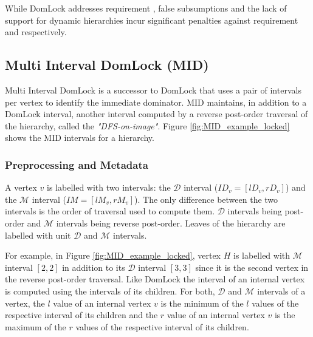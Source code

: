 
While DomLock addresses requirement \Rb, false subsumptions and the lack of support for dynamic hierarchies incur significant penalties against requirement \Rc and \Rd respectively.



\subsection{Multi Interval DomLock (MID)}
Multi Interval DomLock \cite{anjuMID} is a successor to DomLock that uses a pair of intervals per vertex to identify the immediate dominator. MID maintains, in addition to a DomLock interval, another interval computed by a reverse post-order traversal of the hierarchy, called the \emph{"DFS-on-image"}. Figure \ref{fig:MID_example_locked} shows the MID intervals for a hierarchy. 

\subsubsection{Preprocessing and Metadata}

A vertex $v$ is labelled with two intervals: the $\mathcal{D}$ interval ($\mathit{ID}_v = [\mathit{lD}_v, \mathit{rD}_v]$) and the $\mathcal{M}$ interval ($\mathit{IM} = [\mathit{lM}_v, \mathit{rM}_v]$). The only difference between the two intervals is the order of traversal used to compute them. $\mathcal{D}$ intervals being post-order and $\mathcal{M}$ intervals being reverse post-order. Leaves of the hierarchy are labelled with unit $\mathcal{D}$ and $\mathcal{M}$ intervals. 

For example, in Figure \ref{fig:MID_example_locked}, vertex $H$ is labelled with $\mathcal{M}$ interval $[2,2]$ in addition to its $\mathcal{D}$ interval $[3,3]$ since it is the second vertex in the reverse post-order traversal. Like DomLock the interval of an internal vertex is computed using the intervals of its children. For both, $\mathcal{D}$ and $\mathcal{M}$ intervals of a vertex, the $l$ value of an internal vertex $v$ is the minimum of the $l$ values of the respective interval of its children and the $r$ value of an internal vertex $v$ is the maximum of the $r$ values of the respective interval of its children.

